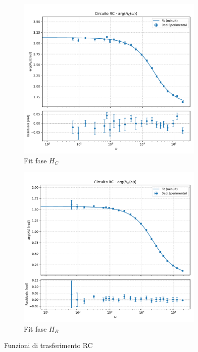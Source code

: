 \documentclass[a4paper]{article}
\begin{document}
\begin{figure}[htbp]
    \vspace{\baselineskip} %

    \begin{subfigure}[b]{0.495\textwidth}
        \centering
        \includegraphics[width=\linewidth]{grafici/rc_fase_hc.pdf} %
        \caption{Fit fase $H_C$}
        \label{fig:rc_fase_hc}
    \end{subfigure}
    \hfill %
    \begin{subfigure}[b]{0.495\textwidth}
        \centering
        \includegraphics[width=\linewidth]{grafici/rc_fase_hr.pdf} %
        \caption{Fit fase $H_R$}
        \label{fig:rc_fase_hr}
    \end{subfigure}

    \caption{Funzioni di trasferimento RC}
    \label{fig:funzioni di traserimento RC}
\end{figure}
\end{document}
